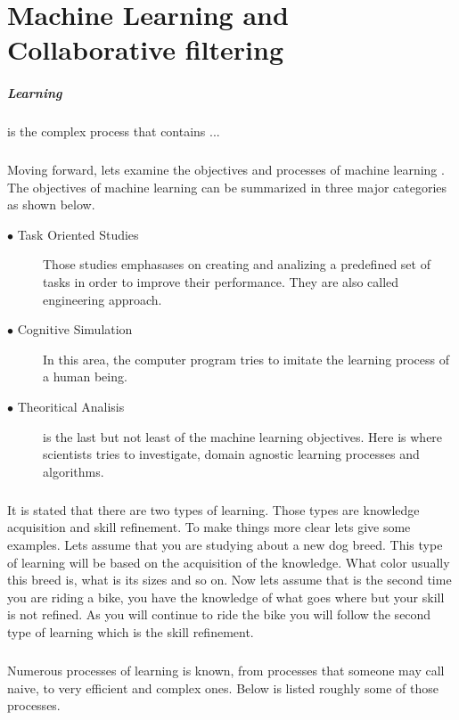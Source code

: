 \newpage
\chapter{Machine Learning and Collaborative filtering}
\paragraph{Learning} is the complex process that contains ...

\paragraph{}Moving forward, lets examine the objectives and processes of machine learning \cite{carbonell1983overview}. The objectives of machine learning can be summarized in three major categories as shown below.

\begin{description}
	\item[$\bullet$ Task Oriented Studies] Those studies emphasases on creating and analizing a predefined set of tasks in order to improve their performance. They are also called engineering approach.
	\item[$\bullet$ Cognitive Simulation] In this area, the computer program tries to imitate the learning process of a human being.
	\item[$\bullet$ Theoritical Analisis] is the last but not least of the machine learning objectives. Here is where scientists tries to investigate, domain agnostic learning processes and algorithms.
\end{description}

\paragraph{} It is stated that there are two types of learning. Those types are knowledge acquisition and skill refinement. To make things more clear lets give some examples. Lets assume that you are studying about a new dog breed. This type of learning will be based on the acquisition of the knowledge. What color usually this breed is, what is its sizes and so on. Now lets assume that is the second time you are riding a bike, you have the knowledge of what goes where but your skill is not refined. As you will continue to ride the bike you will follow the second type of learning which is the skill refinement.

\paragraph{} Numerous processes of learning is known, from processes that someone may call naive, to very efficient and complex ones. Below is listed roughly some of those processes.

